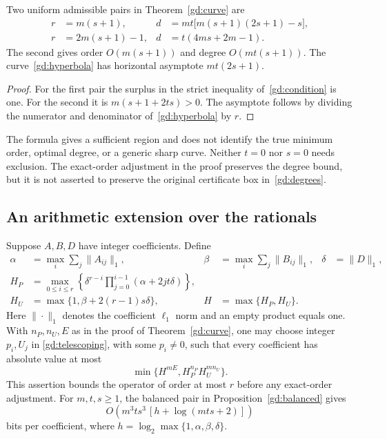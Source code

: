 \begin{proposition}\label{gd:balanced}
Two uniform admissible pairs in Theorem~\ref{gd:curve} are
\begin{align*}
 r&=m(s+1),&
 d&=mt\bigl[m(s+1)(2s+1)-s\bigr],\\
 r&=2m(s+1)-1,&
 d&=t(4ms+2m-1).
\end{align*}
The second gives order $O(m(s+1))$ and degree $O(mt(s+1))$.
The curve~\eqref{gd:hyperbola} has horizontal asymptote $mt(2s+1)$.
\end{proposition}
\begin{proof}
For the first pair the surplus in the strict inequality
of~\eqref{gd:condition} is one. For the second it is
$m(s+1+2ts)>0$. The asymptote follows by dividing the numerator and
denominator of~\eqref{gd:hyperbola} by $r$.
\end{proof}

\begin{remark}\label{gd:sharpness}
The formula gives a sufficient region and does not identify the true
minimum order, optimal degree, or a generic sharp curve. Neither
$t=0$ nor $s=0$ needs exclusion. The exact-order adjustment in the
proof preserves the degree bound, but it is not asserted to preserve
the original certificate box in~\eqref{gd:degrees}.
\end{remark}

\subsection{An arithmetic extension over the rationals}

\begin{proposition}\label{gd:height}
Suppose $A,B,D$ have integer coefficients. Define
\begin{align*}
 \alpha&=\max_i\sum_j\|A_{ij}\|_1,&
 \beta&=\max_i\sum_j\|B_{ij}\|_1,&
 \delta&=\|D\|_1,\\
 H_P&=\max_{0\le i\le r}
  \left\{\delta^{r-i}\prod_{j=0}^{i-1}(\alpha+2jt\delta)\right\},\\
 H_U&=\max\{1,\beta+2(r-1)s\delta\},&
 H&=\max\{H_P,H_U\}.
\end{align*}
Here $\|\cdot\|_1$ denotes the coefficient $\ell_1$ norm and an empty
product equals one. With $n_P,n_U,E$ as in the proof of
Theorem~\ref{gd:curve}, one may choose integer $p_i,U_j$ in
\eqref{gd:telescoping}, with some $p_i\ne0$, such that every coefficient
has absolute value at most
\begin{equation}\label{gd:heightbound}
 \min\{H^{mE},H_P^{n_P}H_U^{mn_U}\}.
\end{equation}
This assertion bounds the operator of order at most $r$ before any
exact-order adjustment. For $m,t,s\ge1$, the balanced pair in
Proposition~\ref{gd:balanced} gives
\[
 O\!\left(m^3ts^3\,[h+\log(mts+2)]\right)
\]
bits per coefficient, where $h=\log_2\max\{1,\alpha,\beta,\delta\}$.
\end{proposition}

